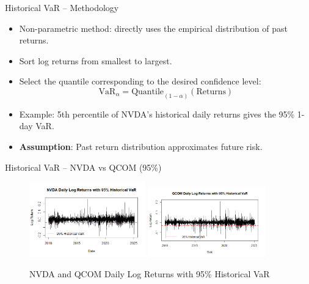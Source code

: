 \documentclass{beamer}[9pt]
\begin{document}
\begin{frame}{Historical VaR – Methodology}
	\begin{itemize}
		\item Non-parametric method: directly uses the empirical distribution of past returns.
		\item Sort log returns from smallest to largest.
		\item Select the quantile corresponding to the desired confidence level:
		\[
		\text{VaR}_{\alpha} = \text{Quantile}_{(1 - \alpha)}(\text{Returns})
		\]
		\item Example: 5th percentile of NVDA’s historical daily returns gives the 95\% 1-day VaR.
		\item \textbf{Assumption}: Past return distribution approximates future risk.
	\end{itemize}
\end{frame}

\begin{frame}{Historical VaR – NVDA vs QCOM (95\%)}
	\begin{figure}[!h]
		\centering
		\includegraphics[width=0.45\textwidth]{plots/nvda_hist_var_plot.png}
		\hspace{0.05\textwidth}
		\includegraphics[width=0.45\textwidth]{plots/qcom_hist_var_plot.png}
		\caption{NVDA and QCOM Daily Log Returns with 95\% Historical VaR}
	\end{figure}
\end{frame}
\end{document}
